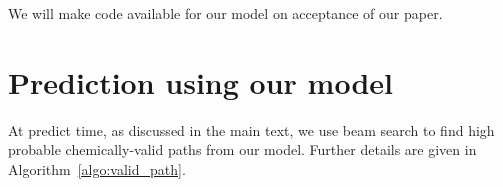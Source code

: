 \documentclass{article}
\begin{document}
We will make code available for our model on acceptance of our paper.  






\section{Prediction using our model}

At predict time, as discussed in the main text, we use beam search to find high probable chemically-valid paths from our model. Further details are given in Algorithm~\ref{algo:valid_path}.







\end{document}
